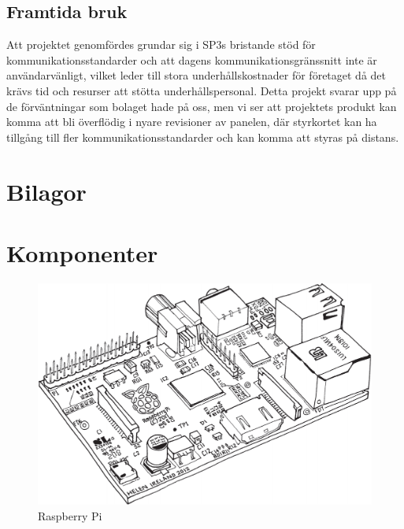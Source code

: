 \documentclass{article}
\begin{document}
        \subsection{Framtida bruk} %
        \label{sub:framtida_bruk}
            Att projektet genomfördes grundar sig i SP3s bristande stöd för kommunikationsstandarder och att dagens kommunikationsgränssnitt inte är användarvänligt, vilket leder till stora underhållskostnader för företaget då det krävs tid och resurser att stötta underhålls\-personal. Detta projekt svarar upp på de förväntningar som bolaget hade på oss, men vi ser att projektets produkt kan komma att bli överflödig i nyare revisioner av panelen, där styrkortet kan ha tillgång till fler kommunikationsstandarder och kan komma att styras på distans.

    \newpage

    \clearpage
    \printbibliography      
    \newpage
    \section{Bilagor} %
    \label{sec:appendix}
    \appendix
        \section{Komponenter} %
        \label{sec:komp}
                \begin{figure}[h!]
                  \centering
                    \includegraphics[scale=0.4]{img/rpi}
                  \caption{Raspberry Pi}
                  \label{fig:raspberry}
                \end{figure}
\end{document}
